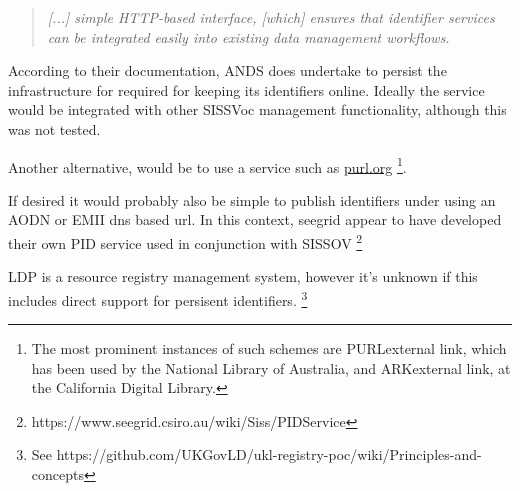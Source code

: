 \documentclass[10pt,a4paper]{article}
\newenvironment{italicquotes}
{\begin{quote}\itshape}
{\end{quote}}
\begin{document}
\begin{flushleft}
  \begin{italicquotes} [...] simple HTTP-based interface, [which] ensures that
  identifier services can be integrated easily into existing data management
  workflows.  \end{italicquotes}
  According to their documentation, ANDS does undertake to persist the infrastructure for required for
  keeping its identifiers online. Ideally the service would be integrated
  with other SISSVoc management functionality, although this was not tested.

  \item[]Another alternative, would be to use a service such as \url{purl.org}  \footnote{ The most
  prominent instances of such schemes are PURLexternal link, which has been used
  by the National Library of Australia, and ARKexternal link, at the California
  Digital Library.  }. 

  \item[]If desired it would probably also be simple to publish identifiers under using an
  AODN or EMII dns based url. In this context, seegrid appear to have developed their own
  PID service used in conjunction with SISSOV  \footnote{
  https://www.seegrid.csiro.au/wiki/Siss/PIDService}  
  
  \item[]LDP is a resource registry management system, however it's unknown 
  if this includes direct support for persisent identifiers.
    \footnote{ See 
    https://github.com/UKGovLD/ukl-registry-poc/wiki/Principles-and-concepts
  }


% 


% 
%   
% 
% 
% 



\end{flushleft}
\end{document}
